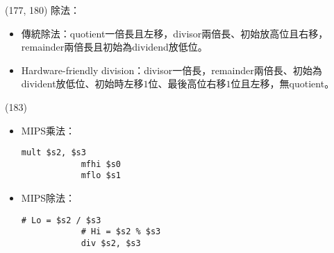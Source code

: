 \item \begin{theorem}{(177, 180)} 除法：\begin{itemize}
        \item 傳統除法：quotient一倍長且左移，divisor兩倍長、初始放高位且右移，remainder兩倍長且初始為dividend放低位。
        \item Hardware-friendly division：divisor一倍長，remainder兩倍長、初始為divident放低位、初始時左移$1$位、最後高位右移$1$位且左移，無quotient。
    \end{itemize}
\end{theorem}

\item \begin{theorem}{(183)} \quad\quad \begin{itemize}
        \item MIPS乘法：\begin{lstlisting}[language={[x86masm]Assembler}]
            mult $s2, $s3
            mfhi $s0
            mflo $s1
        \end{lstlisting} 
        \item MIPS除法：\begin{lstlisting}[language={[x86masm]Assembler}]
            # Lo = $s2 / $s3
            # Hi = $s2 % $s3
            div $s2, $s3
        \end{lstlisting}
    \end{itemize}
\end{theorem}

